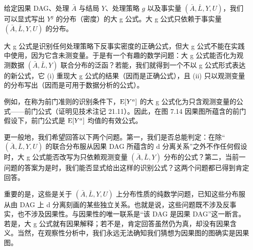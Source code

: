 
给定因果 DAG、处理 $\bar A$ 与结局 $Y$、处理策略 $g$ 以及事实量 $(\bar A,\bar L,Y,U)$，我们可以显式写出 $Y^g$ 的分布（密度）的大 g 公式。大 g 公式只依赖于事实量 $(\bar A,\bar L,Y,U)$ 的分布。

大 g 公式是识别任何处理策略下反事实密度的正确公式，但大 g 公式不能在实践中使用，因为它含未测变量。于是有一个有趣的数学问题：大 g 公式能否化为观测数据 $(\bar A,\bar L,Y)$ 联合分布的泛函？若能，我们就得到一个不以 g 公式形式表达的新公式，它 (i) 重现大 g 公式的结果（因而是正确公式），且 (ii) 只以观测变量的分布写出（因而是可用于数据分析的公式）。

例如，在称为前门准则的识别条件下，$\mathrm{E}[Y^a]$ 的大 g 公式化为只含观测变量的公式——前门公式（证明见技术注记 21.11）。因此，在图 7.14 因果图所蕴含的前门假设下，前门公式是 $\mathrm{E}[Y^a]$ 均值的有效公式。

更一般地，我们希望回答以下两个问题。第一，我们是否总能判定：在除“$(\bar A,\bar L,Y,U)$ 的联合分布服从因果 DAG 所蕴含的 d 分离关系”之外不作任何假设时，大 g 公式能否改写为只依赖观测变量 $(\bar A,\bar L,Y)$ 分布的公式？第二，当前一问题的答案为是时，我们能否显式给出这样的识别公式？这两个问题都已得到肯定回答。


重要的是，这些是关于 $(\bar A,\bar L,Y,U)$ 上分布性质的纯数学问题，已知这些分布服从由 DAG 上 d 分离刻画的某些独立关系。也就是说，这些问题既不涉及反事实，也不涉及因果性。与因果性的唯一联系是“该 DAG 是因果 DAG”这一断言。若是，大 g 公式就有因果解释；若不是，肯定回答虽然仍为真，却没有因果含义。当然，在观察性分析中，我们永远无法确知我们猜想为因果图的图确实是因果图。

